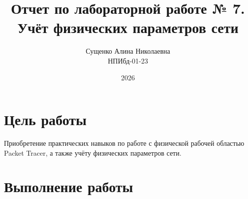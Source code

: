 

\title{Отчет по лабораторной работе № 7. \\ Учёт физических параметров сети}
\author{Сущенко Алина Николаевна \\ НПИбд-01-23}
\date{2026}



\maketitle
\newpage

\tableofcontents

\newpage
\section{Цель работы}
Приобретение практических навыков по работе с физической рабочей областью Packet Tracer, а также учёту физических параметров сети.

\newpage
\section{Выполнение работы}

